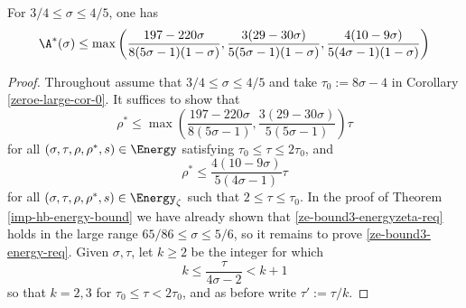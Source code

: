 \begin{theorem}\label{imp-energy-bound3}
    For $3/4 \le \sigma \le 4/5$, one has
    \[
    \A^*(\sigma) \le \max\left(\frac{197 - 220\sigma}{8(5\sigma - 1)(1 - \sigma)}, \frac{3(29 - 30\sigma)}{5(5\sigma - 1)(1 - \sigma)}, \frac{4(10 - 9\sigma)}{5(4\sigma - 1)(1 - \sigma)}\right)
    \]
\end{theorem}

\derived
{}

\begin{proof}
Throughout assume that $3/4 \le \sigma \le 4/5$ and take $\tau_0 := 8\sigma - 4$ in Corollary \ref{zeroe-large-cor-0}. It suffices to show that
\begin{equation}\label{ze-bound3-energy-req}
\rho^* \le \max\left(\frac{197 - 220\sigma}{8(5\sigma - 1)}, \frac{3(29 - 30\sigma)}{5(5\sigma - 1)}\right)\tau
\end{equation}
for all $(\sigma, \tau, \rho, \rho^*, s) \in \Energy$ satisfying $\tau_0 \le \tau \le 2\tau_0$, and
\begin{equation}\label{ze-bound3-energyzeta-req}
\rho^* \le \frac{4(10 - 9\sigma)}{5(4\sigma - 1)}\tau
\end{equation}
for all $(\sigma, \tau, \rho, \rho^*, s) \in \Energy_\zeta$ such that $2 \le \tau \le \tau_0$.
In the proof of Theorem \ref{imp-hb-energy-bound} we have already shown that \eqref{ze-bound3-energyzeta-req} holds in the large range $65/86 \le \sigma \le 5/6$, so it remains to prove \eqref{ze-bound3-energy-req}. Given $\sigma, \tau$, let $k \ge 2$ be the integer for which
\begin{equation}
\label{ze-bound3-kdefn}
k \le \frac{\tau}{4\sigma - 2} < k + 1
\end{equation}
so that $k = 2, 3$ for $\tau_0 \le \tau < 2\tau_0$, and as before write $\tau' := \tau/k$.


\end{proof}
